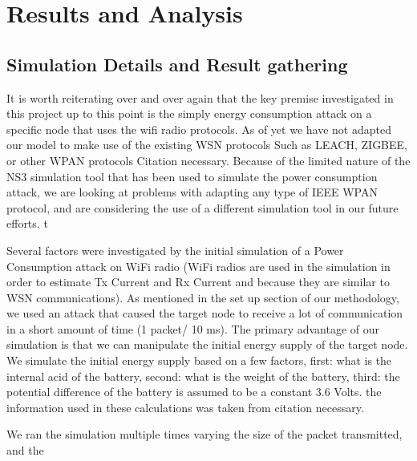 \section{Results and Analysis}

\subsection{Simulation Details and Result gathering}
It is worth reiterating over and over again that the key premise investigated in this project up to this point is the simply energy consumption attack on a specific node that uses the wifi radio protocols. As of yet we have not adapted our model to make use of the existing WSN protocols
Such as LEACH, ZIGBEE, or other WPAN protocols {Citation necessary}. Because of the limited nature of the NS3 simulation tool that has been used to simulate the power consumption attack, we are looking at problems with adapting any type of IEEE WPAN protocol, and are considering the use of a different simulation tool in our future efforts. 
t

Several factors were investigated by the initial simulation of a Power Consumption attack on WiFi radio (WiFi radios are used in the simulation in order to estimate Tx Current and Rx Current and because they are similar to WSN communications). As mentioned in the set up section of our methodology, we used an attack that caused the target node to receive a lot of communication in a short amount of time (1 packet/ 10 ms). The primary advantage of our simulation is that we can manipulate the initial energy supply of the target node. We simulate the initial energy supply based on a few factors, first: what is the internal acid of the battery, second: what is the weight of the battery, third: the potential difference of the battery is assumed to be a constant 3.6 Volts. the information used in these calculations was taken from {citation necessary}.

We ran the simulation multiple times varying the size of the packet transmitted, and the 
